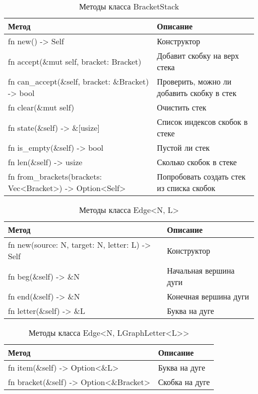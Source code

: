 \begin{table}
    \caption{Методы класса BracketStack}
    \label{class_BracketStack_api}
    \begin{tabular}{|m{20em}|m{20em}|}
        \hline
        \textbf{Метод} & \textbf{Описание}\\
        \hline
            fn new() -> Self & Конструктор \\
        \hline
            fn accept(\&mut self, bracket: Bracket) & Добавит скобку на верх стека \\
        \hline
            fn can\_accept(\&self, bracket: \&Bracket) -> bool & Проверить, можно ли добавить скобку в стек \\
        \hline
            fn clear(\&mut self) & Очистить стек \\
        \hline
            fn state(\&self) -> \&[usize] & Список индексов скобок в стеке \\
        \hline
            fn is\_empty(\&self) -> bool & Пустой ли стек \\
        \hline
            fn len(\&self) -> usize & Сколько скобок в стеке \\
        \hline
            fn from\_brackets(brackets: Vec<Bracket>) -> Option<Self> & Попробовать создать стек из списка скобок \\
        \hline
    \end{tabular}
\end{table}

\begin{table}
    \caption{Методы класса Edge<N, L>}
    \label{class_EdgeNL_api}
    \begin{tabular}{|m{20em}|m{20em}|}
        \hline
        \textbf{Метод} & \textbf{Описание}\\
        \hline
            fn new(source: N, target: N, letter: L) -> Self & Конструктор \\
        \hline
            fn beg(\&self) -> \&N & Начальная вершина дуги \\
        \hline
            fn end(\&self) -> \&N & Конечная вершина дуги \\
        \hline
            fn letter(\&self) -> \&L & Буква на дуге \\
        \hline
    \end{tabular}
\end{table}

\begin{table}
    \caption{Методы класса Edge<N, LGraphLetter<L>{}>}
    \label{class_EdgeNLGraphLetterL_api}
    \begin{tabular}{|m{20em}|m{20em}|}
        \hline
        \textbf{Метод} & \textbf{Описание}\\
        \hline
        fn item(\&self) -> Option<\&L> & Буква на дуге \\
        \hline
            fn bracket(\&self) -> Option<\&Bracket> & Скобка на дуге \\
        \hline
    \end{tabular}
\end{table}

